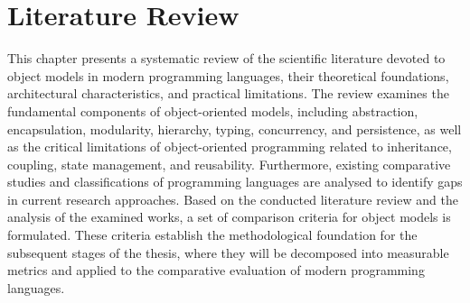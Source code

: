 \chapter{Literature Review}
\label{chap:lr}

This chapter presents a systematic review of the scientific literature devoted to object models in modern programming languages, their theoretical foundations, architectural characteristics, and practical limitations. The review examines the fundamental components of object-oriented models, including abstraction, encapsulation, modularity, hierarchy, typing, concurrency, and persistence, as well as the critical limitations of object-oriented programming related to inheritance, coupling, state management, and reusability. Furthermore, existing comparative studies and classifications of programming languages are analysed to identify gaps in current research approaches. Based on the conducted literature review and the analysis of the examined works, a set of comparison criteria for object models is formulated. These criteria establish the methodological foundation for the subsequent stages of the thesis, where they will be decomposed into measurable metrics and applied to the comparative evaluation of modern programming languages.
